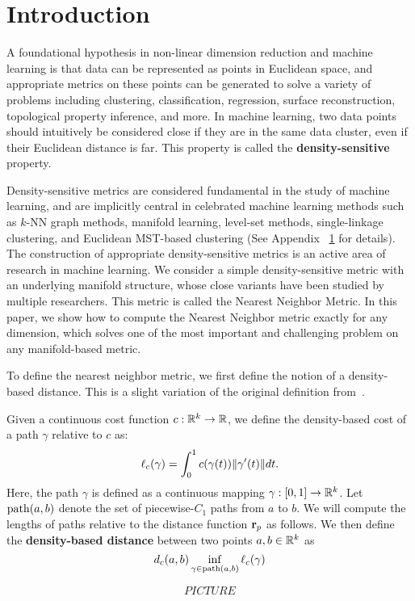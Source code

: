 \section{Introduction} A foundational hypothesis in non-linear dimension
reduction and machine learning is that data can be represented as points in
Euclidean space, and appropriate metrics on these points can be generated
to solve a variety of problems including clustering, classification,
regression, surface reconstruction, topological property inference, and
more. In machine learning, two data points should intuitively be considered
close if they are in the same data cluster, even if their Euclidean
distance is far. This property is called the \textbf{density-sensitive}
property.

Density-sensitive metrics are considered fundamental in the study of
machine learning, and are implicitly central in celebrated machine learning
methods such as $k$-NN graph methods, manifold learning, level-set methods,
single-linkage clustering, and Euclidean MST-based clustering (See Appendix
~\ref{} for details). The construction of appropriate density-sensitive
metrics is an active area of research in machine learning. We consider a
simple density-sensitive metric with an underlying manifold structure,
whose close variants have been studied by multiple researchers. This metric
is called the Nearest Neighbor Metric.  In this paper, we show how to
compute the Nearest Neighbor metric exactly for any dimension, which solves
one of the most important and challenging problem on any manifold-based
metric.

To define the nearest neighbor metric, we first define the notion of a
density-based distance. This is a slight variation of the original
definition from~\cite{}.

\begin{definition}
Given a continuous cost function $c:\mathbb{R}^k \rightarrow \mathbb{R}$, we define the density-based
cost of a path $\gamma$ relative to $c$ as: 
\[ \ell_c(\gamma) = \int_{0}^1 c(\gamma(t)) \| \gamma'(t) \|dt. \]
Here, the path $\gamma$ is defined as a continuous mapping $\gamma:[0,1]
\to \mathbb{R}^k$.
Let $\mathrm{path}(a,b)$ denote the set
of piecewise-$C_1$ paths from $a$ to $b$.  We will compute the
lengths of paths relative to the distance function $\mathbf{r}_p$ as
follows. 
We then define the \textbf{density-based distance} between two points $a, b \in
\mathbb{R}^k$ as 
\[ d_c(a,b) \inf_{\gamma\in\mathrm{path}(a,b)} \ell_c(\gamma)\]
\end{definition} $$PICTURE$$

